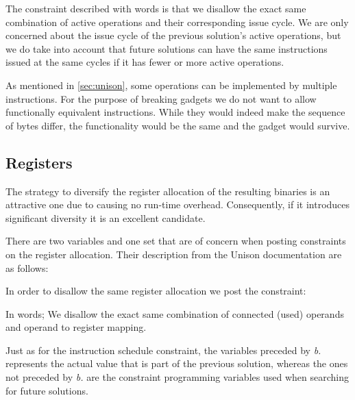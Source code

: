 The constraint described with words is that we disallow the exact same combination of
active operations and their corresponding issue cycle. We are only concerned about the
issue cycle of the previous solution's active operations, but we do take into account that
future solutions can have the same instructions issued at the same cycles if it has fewer
or more active operations.

As mentioned in \ref{sec:unison}, some operations can be implemented by multiple
instructions. For the purpose of breaking gadgets we do not want to allow functionally
equivalent instructions. While they would indeed make the sequence of bytes differ, the
functionality would be the same and the gadget would survive.

\subsection{Registers}

The strategy to diversify the register allocation of the resulting binaries is an attractive
one due to causing no run-time overhead. Consequently, if it introduces significant diversity
it is an excellent candidate.

There are two variables and one set that are of concern when posting constraints on the register
allocation. Their description from the Unison documentation are as follows:

\vspace{0.2cm}

\noindent{}

\vspace{0.2cm}

In order to disallow the same register allocation we post the constraint:

\vspace{0.2cm}
\noindent{}
\vspace{0.2cm}

In words; We disallow the exact same combination of connected (used) operands and
operand to register mapping.

Just as for the instruction schedule constraint, the variables preceded by \textit{b.}
represents the actual value that is part of the previous solution, whereas the ones not
preceded by \textit{b.} are the constraint programming variables used when searching for
future solutions.
